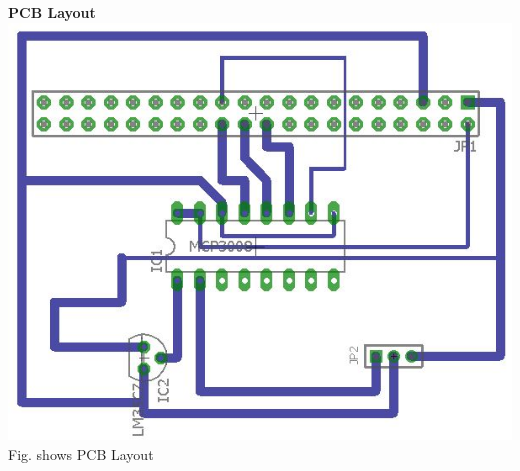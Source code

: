 \documentclass[a4paper,12pt,oneside]{book}
\begin{document}
\flushleft
\textbf{PCB Layout}\\
\centering
\includegraphics[scale=0.4]{adc_layout}
\flushleft
Fig. shows PCB Layout
\end{document}
